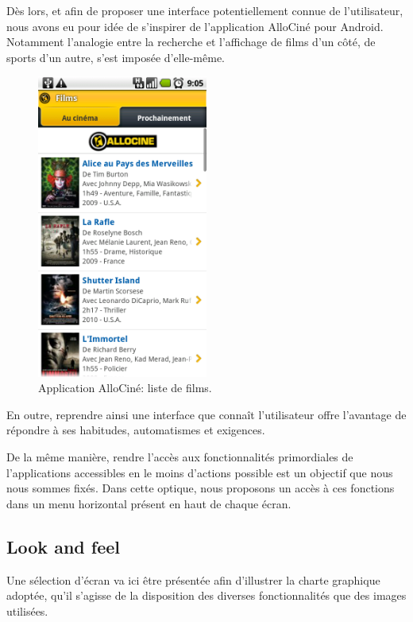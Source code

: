 \documentclass[french, titlepage, 11pt, a4paper]{article}
\begin{document}
	Dès lors, et afin de proposer une interface potentiellement connue de
	l'utilisateur, nous avons eu pour idée de s'inspirer de l'application AlloCiné
	pour Android.
	Notamment l'analogie entre la recherche et l'affichage de films d'un côté, de
	sports d'un autre, s'est imposée d'elle-même.

	\begin{figure}[ht]
		\centering
		\includegraphics[width=0.5\textwidth]{allocine.png}
		\caption{Application AlloCiné: liste de films.}
		\label{fig:allocine}
	\end{figure}

	En outre, reprendre ainsi une interface que connaît l'utilisateur offre
	l'avantage de répondre à ses habitudes, automatismes et exigences.

	De la même manière, rendre l'accès aux fonctionnalités primordiales de
	l'applications accessibles en le moins d'actions possible est un objectif que
	nous nous sommes fixés.
	Dans cette optique, nous proposons un accès à ces fonctions dans un menu
	horizontal présent en haut de chaque écran.

	\subsection{Look and feel}

	Une sélection d'écran va ici être présentée afin d'illustrer la charte
	graphique adoptée, qu'il s'agisse de la disposition des diverses
	fonctionnalités que des images utilisées.
\end{document}
